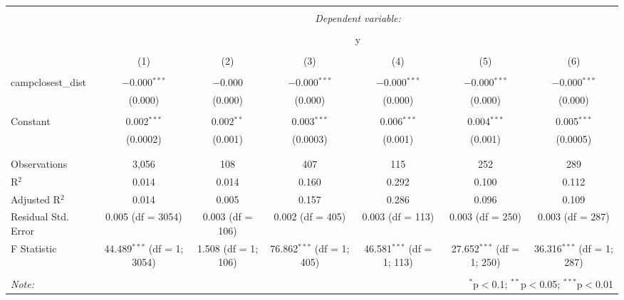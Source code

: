 
\begin{table}[!htbp] \centering 
  \caption{} 
  \label{} 
\begin{tabular}{lcccccc} 
\\[-1.8ex]\hline 
\hline \\[-1.8ex] 
 & \multicolumn{6}{c}{\textit{Dependent variable:}} \\ 
\cline{2-7} 
\\[-1.8ex] & \multicolumn{6}{c}{y} \\ 
\\[-1.8ex] & (1) & (2) & (3) & (4) & (5) & (6)\\ 
\hline \\[-1.8ex] 
 campclosest\_dist & $-$0.000$^{***}$ & $-$0.000 & $-$0.000$^{***}$ & $-$0.000$^{***}$ & $-$0.000$^{***}$ & $-$0.000$^{***}$ \\ 
  & (0.000) & (0.000) & (0.000) & (0.000) & (0.000) & (0.000) \\ 
  & & & & & & \\ 
 Constant & 0.002$^{***}$ & 0.002$^{**}$ & 0.003$^{***}$ & 0.006$^{***}$ & 0.004$^{***}$ & 0.005$^{***}$ \\ 
  & (0.0002) & (0.001) & (0.0003) & (0.001) & (0.001) & (0.0005) \\ 
  & & & & & & \\ 
\hline \\[-1.8ex] 
Observations & 3,056 & 108 & 407 & 115 & 252 & 289 \\ 
R$^{2}$ & 0.014 & 0.014 & 0.160 & 0.292 & 0.100 & 0.112 \\ 
Adjusted R$^{2}$ & 0.014 & 0.005 & 0.157 & 0.286 & 0.096 & 0.109 \\ 
Residual Std. Error & 0.005 (df = 3054) & 0.003 (df = 106) & 0.002 (df = 405) & 0.003 (df = 113) & 0.003 (df = 250) & 0.003 (df = 287) \\ 
F Statistic & 44.489$^{***}$ (df = 1; 3054) & 1.508 (df = 1; 106) & 76.862$^{***}$ (df = 1; 405) & 46.581$^{***}$ (df = 1; 113) & 27.652$^{***}$ (df = 1; 250) & 36.316$^{***}$ (df = 1; 287) \\ 
\hline 
\hline \\[-1.8ex] 
\textit{Note:}  & \multicolumn{6}{r}{$^{*}$p$<$0.1; $^{**}$p$<$0.05; $^{***}$p$<$0.01} \\ 
\end{tabular} 
\end{table} 
